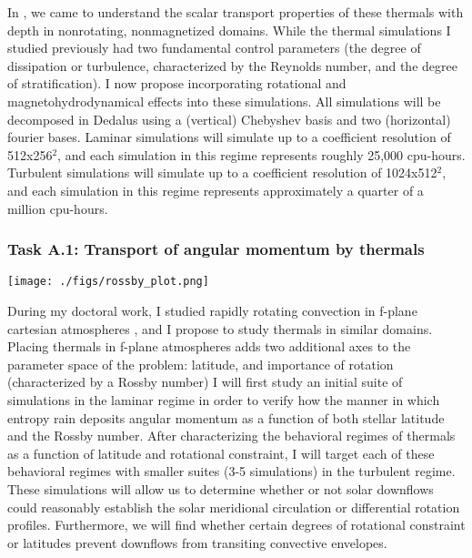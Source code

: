 \documentclass[aasms,12pt]{article}
\begin{document}
In \citet{andersLB2019}, we came to understand the scalar transport properties of these thermals with depth in nonrotating, nonmagnetized domains.
While the thermal simulations I studied previously had two fundamental control parameters (the degree of dissipation or turbulence, characterized by the Reynolds number, and the degree of stratification).
I now propose incorporating rotational and magnetohydrodynamical effects into these simulations.
All simulations will be decomposed in Dedalus using a (vertical) Chebyshev basis and two (horizontal) fourier bases.
Laminar simulations will simulate up to a coefficient resolution of 512x256$^2$, and each simulation in this regime represents roughly 25,000 cpu-hours.
Turbulent simulations will simulate up to a coefficient resolution of 1024x512$^2$, and each simulation in this regime represents approximately a quarter of a million cpu-hours.

\subsubsection{Task A.1: Transport of angular momentum by thermals}

\begin{figure*}[t!]
    \texttt{[image: ./figs/rossby\_plot.png]}
    \caption{ 
	\label{fig:rossby_plot} }
\end{figure*}

During my doctoral work, I studied rapidly rotating convection in f-plane cartesian atmospheres \citep{anders&all2019}, and I propose to study thermals in similar domains.
Placing thermals in f-plane atmospheres adds two additional axes to the parameter space of the problem: latitude, and importance of rotation (characterized by a Rossby number)
I will first study an initial suite of simulations in the laminar regime in order to verify how the manner in which entropy rain deposits angular momentum as a function of both stellar latitude and the Rossby number.
After characterizing the behavioral regimes of thermals as a function of latitude and rotational constraint, I will target each of these behavioral regimes with smaller suites (3-5 simulations) in the turbulent regime.
These simulations will allow us to determine whether or not solar downflows could reasonably establish the solar meridional circulation or differential rotation profiles.
Furthermore, we will find whether certain degrees of rotational constraint or latitudes prevent downflows from transiting convective envelopes.
\end{document}
